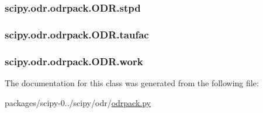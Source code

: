 \subsubsection[{stpd}]{\setlength{\rightskip}{0pt plus 5cm}scipy.\+odr.\+odrpack.\+O\+D\+R.\+stpd}\label{classscipy_1_1odr_1_1odrpack_1_1ODR_a9cd8ca51432cfb48a7b3154aae5cff25}
\hypertarget{classscipy_1_1odr_1_1odrpack_1_1ODR_abb35fe7fdc76a4da005754c2e9cb280f}{}
\subsubsection[{taufac}]{\setlength{\rightskip}{0pt plus 5cm}scipy.\+odr.\+odrpack.\+O\+D\+R.\+taufac}\label{classscipy_1_1odr_1_1odrpack_1_1ODR_abb35fe7fdc76a4da005754c2e9cb280f}
\hypertarget{classscipy_1_1odr_1_1odrpack_1_1ODR_a7374d5b8578845b51374789404928104}{}
\subsubsection[{work}]{\setlength{\rightskip}{0pt plus 5cm}scipy.\+odr.\+odrpack.\+O\+D\+R.\+work}\label{classscipy_1_1odr_1_1odrpack_1_1ODR_a7374d5b8578845b51374789404928104}


The documentation for this class was generated from the following file\+:\begin{DoxyCompactItemize}
\item 
packages/scipy-\/0../scipy/odr/\hyperlink{odrpack_8py}{odrpack.\+py}\end{DoxyCompactItemize}
